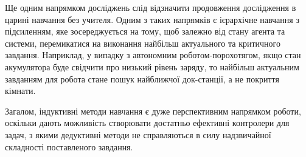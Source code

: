 Ще одним напрямком досліджень слід відзначити продовження дослідження в царині навчання без учителя. Одним з таких напрямків є ієрархічне навчання з підсиленням, яке зосереджується на тому, щоб залежно від стану агента та системи, перемикатися на виконання найбільш актуального та критичного завдання. Наприклад, у випадку з автономним роботом-порохотягом, якщо стан акумулятора буде свідчити про низький рівень заряду, то найбільш актуальним завданням для робота стане пошук найближчої док-станції, а не покриття кімнати.

Загалом, індуктивні методи навчання є дуже перспективним напрямком роботи, оскільки дають можливість створювати достатньо ефективні контролери для задач, з якими дедуктивні методи не справляються в силу надзвичайної складності поставленого завдання.

